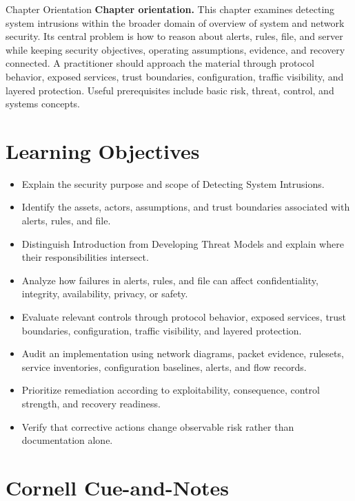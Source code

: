 \documentclass[11pt,letterpaper]{article}
\title{\CornellDocumentTitle}
\author{}
\date{}
\begin{document}
\maketitle
\begin{CornellOverviewBox}{Chapter Orientation}
\textbf{Chapter orientation.} This chapter examines detecting system intrusions within the broader domain of overview of system and network security. Its central problem is how to reason about alerts, rules, file, and server while keeping security objectives, operating assumptions, evidence, and recovery connected. A practitioner should approach the material through protocol behavior, exposed services, trust boundaries, configuration, traffic visibility, and layered protection. Useful prerequisites include basic risk, threat, control, and systems concepts.
\end{CornellOverviewBox}
\section*{Learning Objectives}
\begin{itemize}
\item Explain the security purpose and scope of Detecting System Intrusions.
\item Identify the assets, actors, assumptions, and trust boundaries associated with alerts, rules, and file.
\item Distinguish Introduction from Developing Threat Models and explain where their responsibilities intersect.
\item Analyze how failures in alerts, rules, and file can affect confidentiality, integrity, availability, privacy, or safety.
\item Evaluate relevant controls through protocol behavior, exposed services, trust boundaries, configuration, traffic visibility, and layered protection.
\item Audit an implementation using network diagrams, packet evidence, rulesets, service inventories, configuration baselines, alerts, and flow records.
\item Prioritize remediation according to exploitability, consequence, control strength, and recovery readiness.
\item Verify that corrective actions change observable risk rather than documentation alone.
\end{itemize}
\section*{Cornell Cue-and-Notes}
\end{document}
